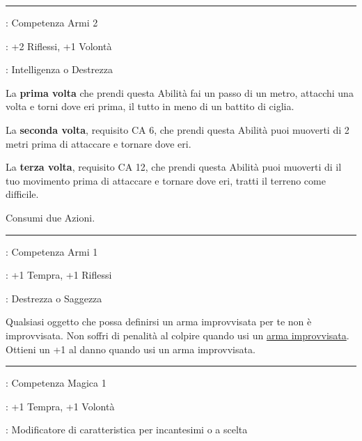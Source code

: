 \begin{multicols}{2}
\smallskip\noindent\rule{\linewidth}{2pt} \hypertarget{Iaijutsu}{}\medskip{}
\noindent
\begin{description}[noitemsep, topsep=0pt, parsep=0pt, partopsep=0pt, leftmargin=0cm, labelwidth=2.5cm]
    \item[\textbf{Requisito}]: Competenza Armi 2
    \item[\textbf{Tiri Salvezza}]: +2 Riflessi, +1 Volontà
    \item[\textbf{Caratteristica}]: Intelligenza o Destrezza
\end{description}

La \textbf{prima volta} che prendi questa Abilità fai un passo di un metro, attacchi una volta e torni dove eri prima, il tutto in meno di un battito di ciglia.

La \textbf{seconda volta}, requisito CA 6, che prendi questa Abilità puoi muoverti di 2 metri prima di attaccare e tornare dove eri.

La \textbf{terza volta}, requisito CA 12, che prendi questa Abilità puoi muoverti di il tuo movimento prima di attaccare e tornare dove eri, tratti il terreno come difficile.

Consumi due Azioni.

\smallskip\noindent\rule{\linewidth}{2pt} \hypertarget{Improvvisare}{}\medskip{}
\noindent
\begin{description}[noitemsep, topsep=0pt, parsep=0pt, partopsep=0pt, leftmargin=0cm, labelwidth=2.5cm]
    \item[\textbf{Requisito}]: Competenza Armi 1
    \item[\textbf{Tiri Salvezza}]: +1 Tempra, +1 Riflessi
    \item[\textbf{Caratteristica}]: Destrezza o Saggezza
\end{description}

Qualsiasi oggetto che possa definirsi un arma improvvisata per te non è improvvisata.
Non soffri di penalità al colpire quando usi un \hyperlink{armaimprovvisata}{arma improvvisata}. Ottieni un +1 al danno quando usi un arma improvvisata.

\smallskip\noindent\rule{\linewidth}{2pt} \hypertarget{Incantatore da Combattimento}{}\medskip{}
\noindent
\begin{description}[noitemsep, topsep=0pt, parsep=0pt, partopsep=0pt, leftmargin=0cm, labelwidth=2.5cm]
    \item[\textbf{Requisito}]: Competenza Magica 1
    \item[\textbf{Tiri Salvezza}]: +1 Tempra, +1 Volontà
    \item[\textbf{Caratteristica}]: Modificatore di caratteristica per incantesimi o a scelta
\end{description}


\end{multicols}
